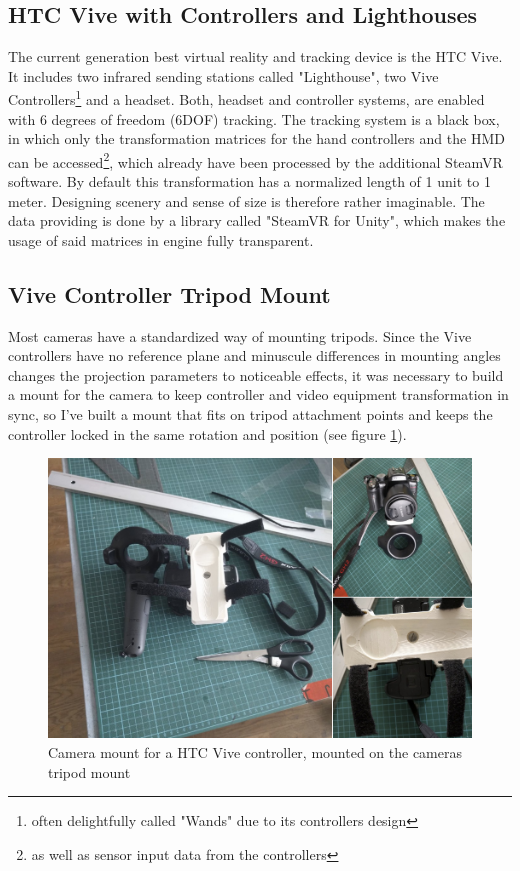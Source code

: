 \subsection{HTC Vive with Controllers and Lighthouses}
The current generation best virtual reality and tracking device is the HTC 
Vive. It includes two infrared sending stations called "Lighthouse", two Vive 
Controllers\footnote{often delightfully called "Wands" due to its controllers 
design} and a headset. Both, headset and controller systems, are enabled with 6 
degrees of freedom (6DOF) tracking. The 
tracking system is a black box, in which only the transformation matrices for 
the hand controllers and the HMD can be accessed\footnote{as well as sensor 
input data from the controllers}, which already have been processed by the 
additional SteamVR software. By default this transformation has a normalized 
length of 1 unit to 1 meter. Designing scenery and sense of size is therefore 
rather imaginable. The data providing is done by a library called "SteamVR for 
Unity", which makes the usage of said matrices in engine fully transparent.

\subsection{Vive Controller Tripod Mount}
Most cameras have a standardized way of mounting tripods. Since the Vive 
controllers have no reference plane and minuscule differences in mounting 
angles changes the projection parameters to noticeable effects, it was 
necessary to build a mount for the camera to keep controller and video 
equipment transformation in sync, so I've built a mount that fits 
on tripod attachment points and keeps the controller locked in the same 
rotation and position (see figure \ref{fig:system:camera-mount}).

\begin{figure}[htb]
	\includegraphics[width=\textwidth]{_raw_resources/ViveStrap-Mount.png}
	\caption{Camera mount for a HTC Vive controller, mounted on the cameras 
	tripod mount}
	\label{fig:system:camera-mount}
\end{figure} 

